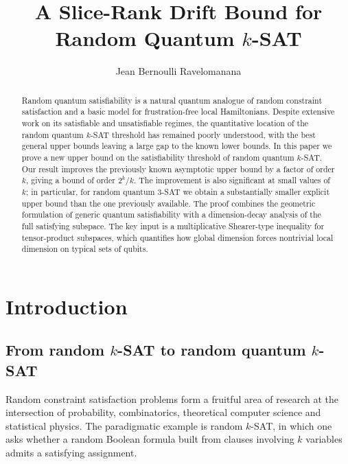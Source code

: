\documentclass[11pt]{article}
\title{A Slice-Rank Drift Bound for Random Quantum \(k\)-SAT}
\author{Jean Bernoulli Ravelomanana}
\date{}
\begin{document}
\maketitle


\begin{abstract}
	Random quantum satisfiability is a natural quantum analogue of random
	constraint satisfaction and a basic model for frustration-free local
	Hamiltonians.  Despite extensive work on its satisfiable and unsatisfiable
	regimes, the quantitative location of the random quantum \(k\)-SAT threshold
	has remained poorly understood, with the best general upper bounds leaving a
	large gap to the known lower bounds.  In this paper we prove a new upper bound
	on the satisfiability threshold of random quantum \(k\)-SAT.  Our result
	improves the previously known asymptotic upper bound by a factor of order
	\(k\), giving a bound of order \(2^k/k\).  The improvement is also significant
	at small values of \(k\); in particular, for random quantum \(3\)-SAT we obtain
	a substantially smaller explicit upper bound than the one previously
	available.  The proof combines the geometric formulation of generic quantum
	satisfiability with a dimension-decay analysis of the full satisfying
	subspace.  The key input is a multiplicative Shearer-type inequality for
	tensor-product subspaces, which quantifies how global dimension forces
	nontrivial local dimension on typical sets of qubits.
\end{abstract}

\section{Introduction}\label{sec:introduction}
\subsection{From random \(k\)-SAT to random quantum \(k\)-SAT}
\label{subsec:motivation-history}

Random constraint satisfaction problems form a fruitful area of research at the
intersection of probability, combinatorics, theoretical computer science and
statistical physics.  The paradigmatic example is random \(k\)-SAT, in which
one asks whether a random Boolean formula built from clauses involving \(k\)
variables admits a satisfying assignment.  
\end{document}

